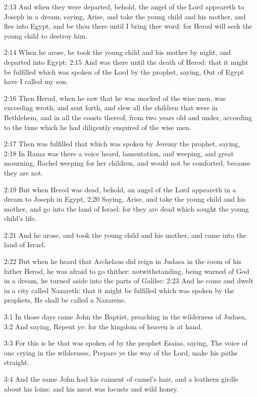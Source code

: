 2:13 And when they were departed, behold, the angel of the Lord
appeareth to Joseph in a dream, saying, Arise, and take the young
child and his mother, and flee into Egypt, and be thou there until I
bring thee word: for Herod will seek the young child to destroy him.

2:14 When he arose, he took the young child and his mother by night,
and departed into Egypt: 2:15 And was there until the death of Herod:
that it might be fulfilled which was spoken of the Lord by the
prophet, saying, Out of Egypt have I called my son.

2:16 Then Herod, when he saw that he was mocked of the wise men, was
exceeding wroth, and sent forth, and slew all the children that were
in Bethlehem, and in all the coasts thereof, from two years old and
under, according to the time which he had diligently enquired of the
wise men.

2:17 Then was fulfilled that which was spoken by Jeremy the prophet,
saying, 2:18 In Rama was there a voice heard, lamentation, and
weeping, and great mourning, Rachel weeping for her children, and
would not be comforted, because they are not.

2:19 But when Herod was dead, behold, an angel of the Lord appeareth
in a dream to Joseph in Egypt, 2:20 Saying, Arise, and take the young
child and his mother, and go into the land of Israel: for they are
dead which sought the young child's life.

2:21 And he arose, and took the young child and his mother, and came
into the land of Israel.

2:22 But when he heard that Archelaus did reign in Judaea in the room
of his father Herod, he was afraid to go thither: notwithstanding,
being warned of God in a dream, he turned aside into the parts of
Galilee: 2:23 And he came and dwelt in a city called Nazareth: that it
might be fulfilled which was spoken by the prophets, He shall be
called a Nazarene.

3:1 In those days came John the Baptist, preaching in the wilderness
of Judaea, 3:2 And saying, Repent ye: for the kingdom of heaven is at
hand.

3:3 For this is he that was spoken of by the prophet Esaias, saying,
The voice of one crying in the wilderness, Prepare ye the way of the
Lord, make his paths straight.

3:4 And the same John had his raiment of camel's hair, and a leathern
girdle about his loins; and his meat was locusts and wild honey.

